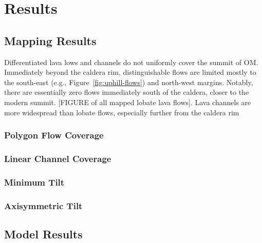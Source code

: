 \chapter{Results}

\section{Mapping Results}

Differentiated lava lows and channels do not uniformly cover the summit of \acf{OM}. Immediately beyond the caldera rim, distinguishable flows are limited mostly to the south-east (e.g., Figure~\ref{fig:uphill-flows}) and north-west margins. Notably, there are essentially zero flows immediately south of the caldera, closer to the modern summit. [FIGURE of all mapped lobate lava flows]. Lava channels are more widespread than lobate flows, especially further from the caldera rim 

\subsection{Polygon Flow Coverage}
\subsection{Linear Channel Coverage}
\subsection{Minimum Tilt}
\subsection{Axisymmetric Tilt}


\section{Model Results}
